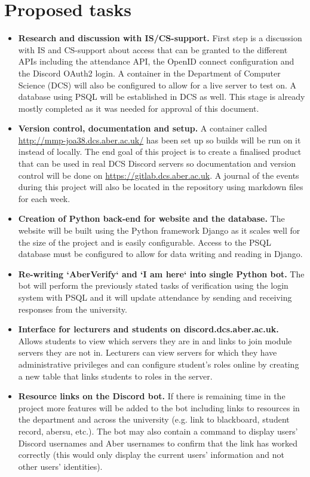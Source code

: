 \documentclass[11pt,fleqn,twoside]{article}
\begin{document}
\section{Proposed tasks}
\begin{itemize}
	\item \textbf{Research and discussion with IS/CS-support.} First step is a discussion with IS and CS-support about access that can be granted to the different APIs including the attendance API, the OpenID connect configuration and the Discord OAuth2 login. A container in the Department of Computer Science (DCS) will also be configured to allow for a live server to test on. A database using PSQL will be established in DCS as well. This stage is already mostly completed as it was needed for approval of this document.
	 
	\item \textbf{Version control, documentation and setup.} A container called \url{http://mmp-joa38.dcs.aber.ac.uk/} has been set up so builds will be run on it instead of locally. The end goal of this project is to create a finalised product that can be used in real DCS Discord servers so documentation and version control will be done on \url{https://gitlab.dcs.aber.ac.uk}. A journal of the events during this project will also be located in the repository using markdown files for each week.
	 
	\item \textbf{Creation of Python back-end for website and the database.} The website will be built using the Python framework Django as it scales well for the size of the project and is easily configurable. Access to the PSQL database must be configured to allow for data writing and reading in Django.
	
	\item \textbf{Re-writing `AberVerify` and `I am here` into single Python bot.} The bot will perform the previously stated tasks of verification using the login system with PSQL and it will update attendance by sending and receiving responses from the university.
	
	\item \textbf{Interface for lecturers and students on discord.dcs.aber.ac.uk.} Allows students to view which servers they are in and links to join module servers they are not in. Lecturers can view servers for which they have administrative privileges and can configure student's roles online by creating a new table that links students to roles in the server.
	
	\item \textbf{Resource links on the Discord bot.} If there is remaining time in the project more features will be added to the bot including links to resources in the department and across the university (e.g. link to blackboard, student record, abersu, etc.). The bot may also contain a command to display users' Discord usernames and Aber usernames to confirm that the link has worked correctly (this would only display the current users' information and not other users' identities).
\end{itemize}
\end{document}
